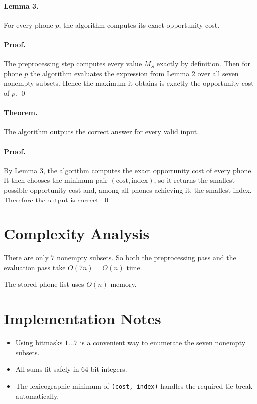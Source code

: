 \documentclass[11pt]{article}
\begin{document}
\paragraph{Lemma 3.}
For every phone $p$, the algorithm computes its exact opportunity cost.

\paragraph{Proof.}
The preprocessing step computes every value $M_S$ exactly by definition.
Then for phone $p$ the algorithm evaluates the expression from Lemma 2 over all seven nonempty subsets.
Hence the maximum it obtains is exactly the opportunity cost of $p$. \qed

\paragraph{Theorem.}
The algorithm outputs the correct answer for every valid input.

\paragraph{Proof.}
By Lemma 3, the algorithm computes the exact opportunity cost of every phone.
It then chooses the minimum pair $(\text{cost}, \text{index})$, so it returns the smallest possible
opportunity cost and, among all phones achieving it, the smallest index.
Therefore the output is correct. \qed

\section*{Complexity Analysis}

There are only $7$ nonempty subsets.
So both the preprocessing pass and the evaluation pass take $O(7n)=O(n)$ time.

The stored phone list uses $O(n)$ memory.

\section*{Implementation Notes}

\begin{itemize}[leftmargin=*]
    \item Using bitmasks $1 \dots 7$ is a convenient way to enumerate the seven nonempty subsets.
    \item All sums fit safely in 64-bit integers.
    \item The lexicographic minimum of \texttt{(cost, index)} handles the required tie-break automatically.
\end{itemize}
\end{document}
